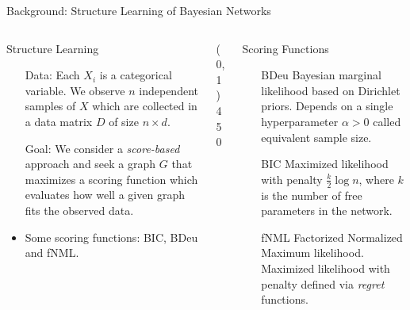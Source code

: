 \documentclass[final]{beamer}
\newcommand{\heading}[1]{\alert{\large #1}\\}
\theoremstyle{plain}
\begin{document}
\begin{frame}{}
\begin{block}{Background: Structure Learning of Bayesian Networks}
\begin{columns}[T]
   \begin{column}{0.3\textwidth} %
     \heading{Structure Learning}
     \vspace*{12pt}
     \begin{itemize}
     \setlength\itemsep{1em}
     \item[Data:] Each $X_i$ is a categorical variable. We observe $n$ independent samples of $X$ which are collected in a data matrix $D$ of size $n\times d$. 
     \item[Goal:] We consider a \textit{score-based} approach and seek a graph $G$ that maximizes a scoring function which evaluates how well a given graph fits the observed data.
     \item Some scoring functions: BIC, BDeu and fNML. 
   	 \end{itemize}
   \end{column}
  
   \begin{column}{0.005\textwidth}\linethickness{0.3ex} %
      \color{myPurple} \line(0,1){450}
   \end{column} %
   \begin{column}{0.3\textwidth}%
     \heading{Scoring Functions}
     \begin{itemize}
     
	 \vspace*{12pt}
	 \setlength\itemsep{1em}     
     \item[BDeu] Bayesian marginal likelihood based on Dirichlet priors. Depends on a single 
     hyperparameter $\alpha >0$ called equivalent sample size. 
     \item[BIC] Maximized likelihood with penalty $\frac{k}{2}\log n$, where $k$ is the number of free parameters in the network. 
     \item[fNML] Factorized Normalized Maximum likelihood. Maximized likelihood with penalty defined via \textit{regret} functions.
     \end{itemize}
     
   \end{column} %
\end{columns}
\end{block}



\end{frame}
\end{document}
